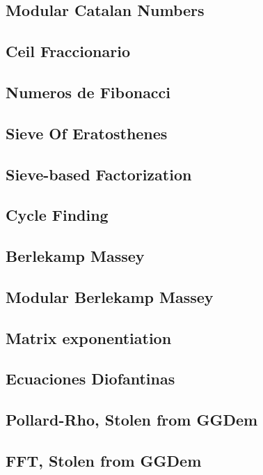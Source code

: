 \subsection{Modular Catalan Numbers}
\subsection{Ceil Fraccionario}
\subsection{Numeros de Fibonacci}
\subsection{Sieve Of Eratosthenes}
\subsection{Sieve-based Factorization}
\subsection{Cycle Finding}
\subsection{Berlekamp Massey}
\subsection{Modular Berlekamp Massey}
\subsection{Matrix exponentiation}
\subsection{Ecuaciones Diofantinas}
\subsection{Pollard-Rho, Stolen from GGDem}
\subsection{FFT, Stolen from GGDem}
